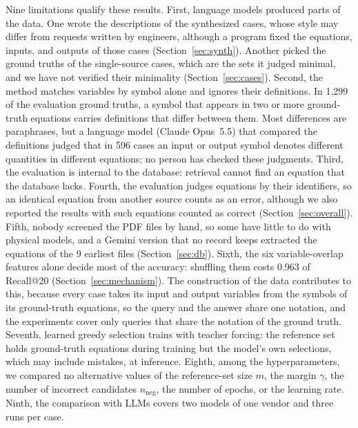 Nine limitations qualify these results. First, language models produced parts of the data. One
wrote the descriptions of the synthesized cases, whose style may differ from requests written by
engineers, although a program fixed the equations, inputs, and outputs of those cases
(Section~\ref{sec:synth}). Another picked the ground truths of the single-source cases, which are
the sets it judged minimal, and we have not verified their minimality (Section~\ref{sec:cases}). Second, the method matches
variables by symbol alone and ignores their definitions. In 1,299 of the evaluation ground truths, a
symbol that appears in two or more
ground-truth equations carries definitions that differ between them. Most differences are
paraphrases, but a language model (Claude Opus~5.5) that compared the definitions judged that in
596 cases an input or output symbol denotes different quantities in different equations; no person
has checked these judgments.
Third, the evaluation is internal to the database: retrieval cannot find an equation that the
database lacks. Fourth, the evaluation judges equations by their identifiers, so an identical
equation from another source counts as an error, although we also reported the results with such
equations counted as correct (Section~\ref{sec:overall}). Fifth, nobody screened the PDF files by hand,
so some
have little to do with physical models, and a Gemini version that no record keeps extracted the
equations of the 9 earliest files (Section~\ref{sec:db}).
Sixth, the six variable-overlap features alone decide most of the accuracy: shuffling them costs
0.963 of Recall@20 (Section~\ref{sec:mechanism}). The construction of the data contributes to
this, because every case takes its input and output variables from the symbols of its ground-truth
equations, so the query and the answer share one notation, and the experiments cover only queries
that share the notation of the ground truth. Seventh, learned greedy selection trains
with teacher forcing: the reference set holds ground-truth equations during training but the model's
own selections, which may include mistakes, at inference. Eighth, among the hyperparameters, we
compared no alternative values of the reference-set size $m$, the margin $\gamma$, the number of
incorrect candidates $n_{\mathrm{neg}}$, the number of epochs, or the learning rate. Ninth, the comparison with LLMs
covers two models of one vendor and three runs per case.
